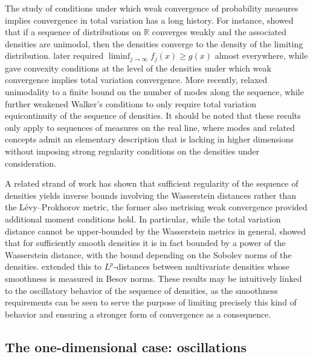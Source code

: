 \documentclass[12pt]{article}
\newcommand{\RR}{\mathbb{R}}
\begin{document}
The study of conditions under which weak convergence of probability measures implies convergence
in total variation has a long history. For instance, \cite{hettmansperger1974note} showed that if
a sequence of distributions on $\RR$ converges weakly and the associated densities are unimodal,
then the densities converge to the density of the limiting distribution. \cite{dellacherie1978probabilities} later required $\liminf_{j\to\infty}f_j(x)\geq g(x)$ almost everywhere, while \cite{visintin1984strong} gave convexity conditions at the level of
the densities under which weak convergence implies total variation convergence. More recently,
\cite{walker2023comparing} relaxed unimodality to a finite bound on the number of modes along the
sequence, while \cite{mynbaev2026equivalence} further weakened Walker's conditions to only require total variation equicontinuity of the sequence of densities. It should be noted that these results only apply to sequences of measures on the real line, where modes
and related concepts admit an elementary description that is lacking in higher dimensions without imposing strong regularity conditions on the densities under consideration.

A related strand of work has shown that sufficient regularity of the sequence of densities yields
inverse bounds involving the Wasserstein distances \citep{Villani2009} rather than the
Lévy--Prokhorov metric, the former also metrising weak convergence provided additional moment
conditions hold. In particular, while the total variation distance cannot be upper-bounded by the
Wasserstein metrics in general, \cite{chae2020wasserstein} showed that for sufficiently smooth
densities it is in fact bounded by a power of the Wasserstein distance, with the bound depending on the
Sobolev norms of the densities. \cite{chae2024wasserstein} extended this to $L^p$-distances
between multivariate densities whose smoothness is measured in Besov norms. These results may be
intuitively linked to the oscillatory behavior of the sequence of densities, as the smoothness
requirements can be seen to serve the purpose of limiting precisely this kind of behavior and
ensuring a stronger form of convergence as a consequence.


\subsection{The one-dimensional case: oscillations}
\end{document}
